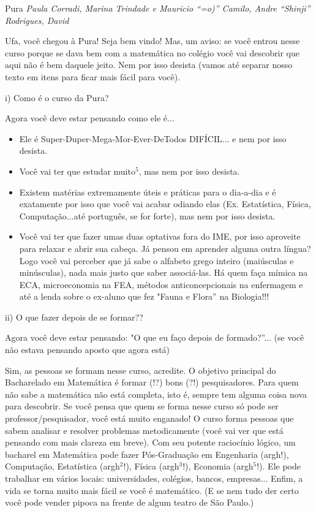 \begin{subsecao}{Pura}
{\em Paula Corradi, Marina Trindade e Mauricio ``=o)'' Camilo,
Andre “Shinji” Rodrigues, David}


Ufa, você chegou à Pura! Seja bem vindo! Mas, um aviso: se você entrou nesse
curso porque se dava bem com a matemática no colégio você vai descobrir que
aqui não é bem daquele jeito. Nem por isso desista (vamos até separar nosso
texto em itens para ficar mais fácil para você).

i) Como é o curso da Pura?

Agora você deve estar pensando como ele é...
\begin{itemize}

\item Ele é Super-Duper-Mega-Mor-Ever-DeTodos DIFÍCIL... e nem por isso desista.
\item  Você vai ter que estudar muito$^5$, mas nem por isso desista.
\item  Existem matérias extremamente úteis e práticas para o dia-a-dia e é
exatamente por isso que você vai acabar odiando elas (Ex. Estatística, Física,
Computação...até português, se for forte), mas nem por isso desista.
\item  Você vai ter que fazer umas duas optativas fora do IME, por isso
aproveite para relaxar e abrir sua cabeça. Já pensou em aprender alguma outra
língua? Logo você vai perceber que já sabe o alfabeto grego inteiro (maiúsculas
e minúsculas), nada mais justo que saber associá-las. Há quem faça mímica na
ECA, microeconomia na FEA, métodos anticoncepcionais na enfermagem e até a
lenda sobre o ex-aluno que fez "Fauna e Flora” na Biologia!!!

\end{itemize}
ii) O que fazer depois de se formar??

Agora você deve estar pensando: "O que eu faço depois de formado?”... (se você
não estava pensando aposto que agora está)

Sim, as pessoas se formam nesse curso, acredite. O objetivo principal do
Bacharelado em Matemática é formar (!?) bons (?!) pesquisadores. Para quem não
sabe a matemática não está completa, isto é, sempre tem alguma coisa nova para
descobrir. Se você pensa que quem se forma nesse curso só pode ser
professor/pesquisador, você está muito enganado! O curso forma pessoas que
sabem analisar e resolver problemas metodicamente (você vai ver que está
pensando com mais clareza em breve). Com seu potente raciocínio lógico, um
bacharel em Matemática pode fazer Pós-Graduação em Engenharia (argh!),
Computação, Estatística (argh$^2$!), Física (argh$^3$!), Economia (argh$^5$!).
Ele pode trabalhar em vários locais: universidades, colégios, bancos,
empresas... Enfim, a vida se torna muito mais fácil se você é matemático. (E se
nem tudo der certo você pode vender pipoca na frente de algum teatro de São
Paulo.)


\end{subsecao}
